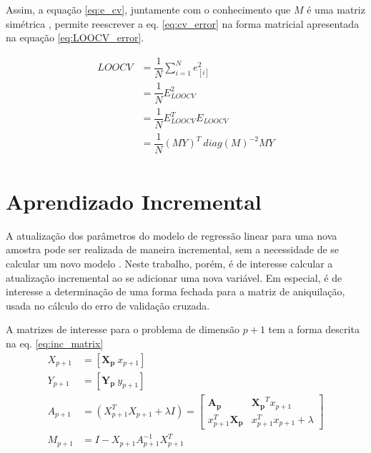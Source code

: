Assim, a equação \ref{eq:e_cv}, juntamente com o conhecimento que $M$ é uma matriz simétrica \cite{stats_models}, permite reescrever a eq. \ref{eq:cv_error} na forma matricial apresentada na equação \ref{eq:LOOCV_error}.

\begin{equation}
    \begin{split}
        LOOCV   &= \dfrac{1}{N} \sum_{i=1}^{N}e^2_{[i]} \\
                &= \dfrac{1}{N} E_{LOOCV}^2 \\
                &= \dfrac{1}{N}E_{LOOCV}^TE_{LOOCV} \\
                &= \dfrac{1}{N} (MY)^T\ diag(M)^{-2}MY \\
    \end{split}
    \label{eq:LOOCV_error}
\end{equation}

\section{Aprendizado Incremental}

A atualização dos parâmetros do modelo de regressão linear para uma nova amostra pode ser realizada de maneira incremental, sem a necessidade de se calcular um novo modelo \cite{mit_onlinereg}. Neste trabalho, porém, é de interesse calcular a atualização incremental ao se adicionar uma nova variável. Em especial, é de interesse a determinação de uma forma fechada para a matriz de aniquilação, usada no cálculo do erro de validação cruzada.

A matrizes de interesse para o problema de dimensão $p+1$ tem a forma descrita na eq. \ref{eq:inc_matrix} 
\begin{equation}
    \begin{split}
    X_{p+1} &= \left[\mathbf{X_p}\ x_{p+1}\right] \\
    Y_{p+1} &= \left[\mathbf{Y_p}\ y_{p+1}\right] \\
    A_{p+1} &= (X_{p+1}^T X_{p+1} + \lambda I ) = 
    \begin{bmatrix}
        \mathbf{A_p} & \mathbf{X_p}^T x_{p+1} \\
        x_{p+1}^T \mathbf{X_p} & x_{p+1}^T x_{p+1} + \lambda
    \end{bmatrix}  \\
    M_{p+1} &= I - X_{p+1} A_{p+1}^{-1} X_{p+1}^T \\ 
    \end{split}  
    \label{eq:inc_matrix}
\end{equation}

